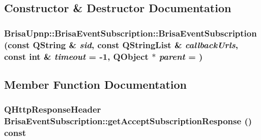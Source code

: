 \subsection{Constructor \& Destructor Documentation}
\hypertarget{classBrisaUpnp_1_1BrisaEventSubscription_ae06a65973bacd60ed46c362ba5359b81}{
\subsubsection[{BrisaEventSubscription}]{\setlength{\rightskip}{0pt plus 5cm}BrisaUpnp::BrisaEventSubscription::BrisaEventSubscription (const QString \& {\em sid}, \/  const QStringList \& {\em callbackUrls}, \/  const int \& {\em timeout} = {\ttfamily -\/1}, \/  QObject $\ast$ {\em parent} = {})}}
\label{classBrisaUpnp_1_1BrisaEventSubscription_ae06a65973bacd60ed46c362ba5359b81}


\subsection{Member Function Documentation}
\hypertarget{classBrisaUpnp_1_1BrisaEventSubscription_ad5eab9edcfaf289688a67340d1fb0865}{
\subsubsection[{getAcceptSubscriptionResponse}]{\setlength{\rightskip}{0pt plus 5cm}QHttpResponseHeader BrisaEventSubscription::getAcceptSubscriptionResponse () const}}
\label{classBrisaUpnp_1_1BrisaEventSubscription_ad5eab9edcfaf289688a67340d1fb0865}


